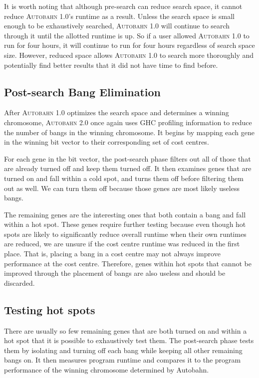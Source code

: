 \documentclass[format=sigplan, review=true]{acmart}
\newcommand{\hotspot}[0]{hot spot}
\newcommand{\hotspots}[0]{hot spots}
\newcommand{\coldspot}[0]{cold spot}
\newcommand{\useless}[0]{useless}
\newcommand{\Ao}[0]{\textsc{Autobahn 1.0}}
\newcommand{\At}[0]{\textsc{Autobahn 2.0}}
\newcommand{\preopt}[0]{pre-search}
\newcommand{\postopt}[0]{post-search}
\newcommand{\Postopt}[0]{Post-search}
\begin{document}
It is worth noting that although \preopt{} can reduce search space, it cannot reduce \Ao{}'s runtime as a result. Unless the search space is small enough to be exhaustively searched, \Ao{} will continue to search through it until the allotted runtime is up. So if a user allowed \Ao{} to run for four hours, it will continue to run for four hours regardless of search space size. However, reduced space allows \Ao{} to search more thoroughly and potentially find better results that it did not have time to find before. 

\subsection{\Postopt{} Bang Elimination}

After \Ao{} optimizes the search space and determines a winning chromosome, \At{} once again uses GHC profiling information to reduce the number of bangs in the winning chromosome. It begins by mapping each gene in the winning bit vector to their corresponding set of cost centres. 

For each gene in the bit vector, the \postopt{} phase filters out all of those that are already turned off and keep them turned off. It then examines genes that are turned on and fall within a \coldspot{}, and turns them off before filtering them out as well. We can turn them off because those genes are most likely \useless{} bangs. 

The remaining genes are the interesting ones that both contain a bang and fall within a \hotspot{}. These genes require further testing because even though \hotspots{} are likely to significantly reduce overall runtime when their own runtimes are reduced, we are unsure if the cost centre runtime was reduced in the first place. That is, placing a bang in a cost centre may not always improve performance at the cost centre. Therefore, genes within \hotspots{} that cannot be improved through the placement of bangs are also \useless{} and should be discarded.

\subsection{Testing \hotspots{}}
 
There are usually so few remaining genes that are both turned on and within a \hotspot{} that it is possible to exhaustively test them. The \postopt{} phase tests them by isolating and turning off each bang while keeping all other remaining bangs on. It then measures program runtime and compares it to the program performance of the winning chromosome determined by Autobahn. 
\end{document}
